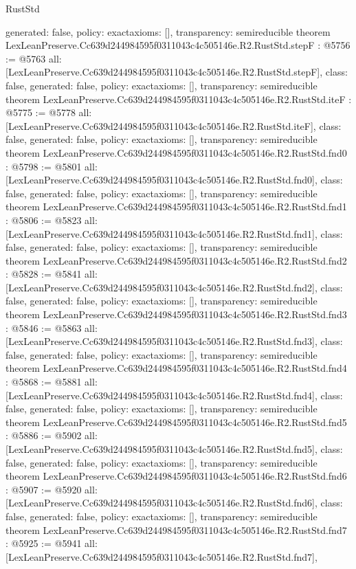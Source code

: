 \begin{lexlean}{RustStd}
\begin{coremodule}
{  generated: false,
  policy: exact{axioms: []},
  transparency: semireducible
}
theorem LexLeanPreserve.Cc639d244984595f0311043c4c505146e.R2.RustStd.stepF : @5756 := @5763 {
  all: [LexLeanPreserve.Cc639d244984595f0311043c4c505146e.R2.RustStd.stepF],
  class: false,
  generated: false,
  policy: exact{axioms: []},
  transparency: semireducible
}
theorem LexLeanPreserve.Cc639d244984595f0311043c4c505146e.R2.RustStd.iteF : @5775 := @5778 {
  all: [LexLeanPreserve.Cc639d244984595f0311043c4c505146e.R2.RustStd.iteF],
  class: false,
  generated: false,
  policy: exact{axioms: []},
  transparency: semireducible
}
theorem LexLeanPreserve.Cc639d244984595f0311043c4c505146e.R2.RustStd.fnd0 : @5798 := @5801 {
  all: [LexLeanPreserve.Cc639d244984595f0311043c4c505146e.R2.RustStd.fnd0],
  class: false,
  generated: false,
  policy: exact{axioms: []},
  transparency: semireducible
}
theorem LexLeanPreserve.Cc639d244984595f0311043c4c505146e.R2.RustStd.fnd1 : @5806 := @5823 {
  all: [LexLeanPreserve.Cc639d244984595f0311043c4c505146e.R2.RustStd.fnd1],
  class: false,
  generated: false,
  policy: exact{axioms: []},
  transparency: semireducible
}
theorem LexLeanPreserve.Cc639d244984595f0311043c4c505146e.R2.RustStd.fnd2 : @5828 := @5841 {
  all: [LexLeanPreserve.Cc639d244984595f0311043c4c505146e.R2.RustStd.fnd2],
  class: false,
  generated: false,
  policy: exact{axioms: []},
  transparency: semireducible
}
theorem LexLeanPreserve.Cc639d244984595f0311043c4c505146e.R2.RustStd.fnd3 : @5846 := @5863 {
  all: [LexLeanPreserve.Cc639d244984595f0311043c4c505146e.R2.RustStd.fnd3],
  class: false,
  generated: false,
  policy: exact{axioms: []},
  transparency: semireducible
}
theorem LexLeanPreserve.Cc639d244984595f0311043c4c505146e.R2.RustStd.fnd4 : @5868 := @5881 {
  all: [LexLeanPreserve.Cc639d244984595f0311043c4c505146e.R2.RustStd.fnd4],
  class: false,
  generated: false,
  policy: exact{axioms: []},
  transparency: semireducible
}
theorem LexLeanPreserve.Cc639d244984595f0311043c4c505146e.R2.RustStd.fnd5 : @5886 := @5902 {
  all: [LexLeanPreserve.Cc639d244984595f0311043c4c505146e.R2.RustStd.fnd5],
  class: false,
  generated: false,
  policy: exact{axioms: []},
  transparency: semireducible
}
theorem LexLeanPreserve.Cc639d244984595f0311043c4c505146e.R2.RustStd.fnd6 : @5907 := @5920 {
  all: [LexLeanPreserve.Cc639d244984595f0311043c4c505146e.R2.RustStd.fnd6],
  class: false,
  generated: false,
  policy: exact{axioms: []},
  transparency: semireducible
}
theorem LexLeanPreserve.Cc639d244984595f0311043c4c505146e.R2.RustStd.fnd7 : @5925 := @5941 {
  all: [LexLeanPreserve.Cc639d244984595f0311043c4c505146e.R2.RustStd.fnd7],
}
\end{coremodule}
\end{lexlean}

